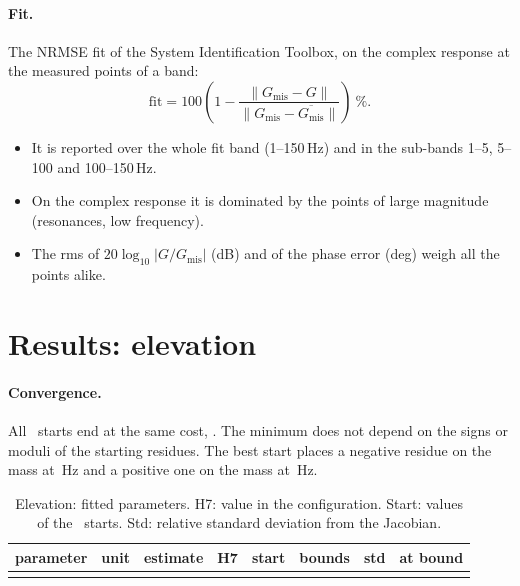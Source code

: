 \documentclass[10pt,a4paper]{article}
\numberwithin{equation}{section}
\begin{document}
\paragraph{Fit.} The NRMSE fit of the System Identification Toolbox, on the complex response at the measured points of a band:
\begin{equation}
\mathrm{fit}=100\left(1-\frac{\lVert G_\mathrm{mis}-G\rVert}{\lVert G_\mathrm{mis}-\overline{G_\mathrm{mis}}\rVert}\right)\ \% .
\end{equation}
\begin{itemize}
\item It is reported over the whole fit band (1--150\,Hz) and in the sub-bands 1--5, 5--100 and 100--150\,Hz.
\item On the complex response it is dominated by the points of large magnitude (resonances, low frequency).
\item The rms of $20\log_{10}|G/G_\mathrm{mis}|$ (dB) and of the phase error (deg) weigh all the points alike.
\end{itemize}

\section{Results: elevation}\label{sec:res_elev}
\paragraph{Convergence.} All \nStartsP\ starts end at the same cost, \costP. The minimum does not depend on the signs or moduli of the starting residues. The best start places a negative residue on the mass at \fMassI\,Hz and a positive one on the mass at \fMassII\,Hz.

\begin{table}[H]\centering\small
\caption{Elevation: fitted parameters. H7: value in the configuration. Start: values of the \nStartsP\ starts. Std: relative standard deviation from the Jacobian.}\label{tab:polar_params}
\begin{tabular}{llrrL{3.0cm}lrl}\toprule
parameter & unit & estimate & H7 & start & bounds & std & at bound \\ \midrule
\\ \bottomrule
\end{tabular}\end{table}
\end{document}
